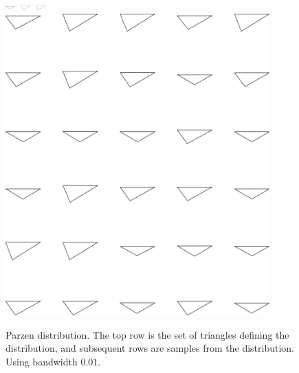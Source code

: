 \begin{figure}
\includegraphics[width=0.6in]{output/1.models/test_parzen/parzen_true.png}\\ 
\includegraphics[width=4in]{output/1.models/test_parzen/parzen_0.01_samples.png}\\ 
\caption{Parzen distribution. The top row is the set of triangles
  defining the distribution, and subsequent rows are samples from the
  distribution. Using bandwidth $0.01$. }
\label{fig-parzen-1}
\end{figure}

